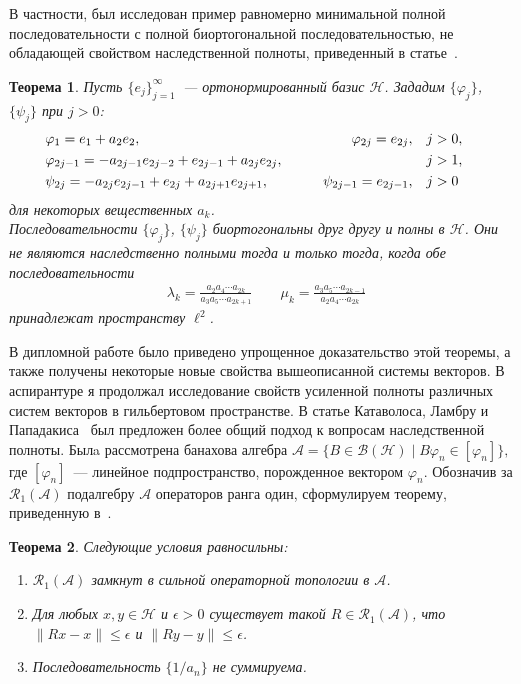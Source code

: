\documentclass[a4paper,12pt]{article}
\renewcommand{\cal}[1]{\mathcal{#1}}
\renewcommand{\leq}{\leqslant}
\renewcommand{\phi}{\varphi}
\newtheorem{theorem}{Теорема}
\numberwithin{prop_under_lemma}{lemma}
\begin{document}
В частности, был исследован пример равномерно минимальной полной последовательности
с полной биортогональной последовательностью, не обладающей свойством наследственной полноты, приведенный в статье~\cite{azoff}.
\begin{theorem}
  \label{thm_seq}
  Пусть $\{e_j\}_{j=1}^\infty$~--- ортонормированный базис $\mathcal{H}$. Зададим $\{\phi_j\}$, $\{\psi_j\}$ при $j > 0$:
  \begin{equation}
    \label{main-system}
    \begin{aligned}
      &\phi_1 = e_1 + a_2 e_2, \qquad &\phi_{2j}=e_{2j}, \quad&j > 0,&\\
      &\phi_{2j-1}=-a_{2j-1}e_{2j-2} + e_{2j-1} + a_{2j}e_{2j}, \qquad &\makebox[5em]{} \quad&j > 1,&\\
      &\psi_{2j}=-a_{2j}e_{2j-1}+e_{2j}+a_{2j+1}e_{2j+1}, \qquad &\psi_{2j-1}=e_{2j-1}, \quad&j > 0&
    \end{aligned}
  \end{equation}
  для некоторых вещественных $a_k$.
  \smallskip
  \\Последовательности $\{\phi_j\}$, $\{\psi_j\}$ биортогональны друг другу и полны в $\cal{H}$. Они
  не являются наследственно полными тогда и только тогда, когда обе последовательности
  \begin{equation}
    \label{sequences}
    \begin{aligned}
      &\lambda_k = \frac{a_2 a_4\cdots a_{2k}}{a_3 a_5\cdots a_{2k+1}}\qquad
      \mu_k = \frac{a_3 a_5 \cdots a_{2k - 1}}{a_2 a_4 \cdots a_{2k}}
    \end{aligned}
  \end{equation}
  принадлежат пространству $\ell^2$.
\end{theorem}
В дипломной работе было приведено упрощенное доказательство этой теоремы, а также получены некоторые новые
  свойства вышеописанной системы векторов.
В аспирантуре я продолжал исследование свойств усиленной полноты различных систем векторов
  в гильбертовом пространстве.
В статье Катаволоса, Ламбру и Пападакиса~\cite{katavolos} был предложен более общий подход
  к вопросам наследственной полноты.
Былa рассмотрена банахова алгебра $\cal{A}=\{B\in\cal{B}(\cal{H}) \mid B \phi_n \in [\phi_n]\},$
  где $[\phi_n]$~--- линейное подпространство, порожденное вектором $\phi_n$.
Обозначив за $\cal{R}_1(\cal{A})$ подалгебру $\cal{A}$ операторов ранга один, сформулируем теорему, приведенную в~\cite{katavolos}.
\begin{theorem}
  \label{thm_katavolos}
  Следующие условия равносильны:
  \begin{enumerate}
    \item $\cal{R}_1(\cal{A})$ замкнут в сильной операторной топологии в $\cal{A}$.
    \item Для любых $x, y \in \cal{H}$ и $\epsilon > 0$ существует такой $R\in\cal{R}_1(\cal{A})$,
      что \newline $\|Rx - x\|\leq \epsilon$ и $\|Ry - y\|\leq \epsilon$.
    \item Последовательность $\{1/a_n\}$ не суммируема.
  \end{enumerate}
\end{theorem}
\end{document}

